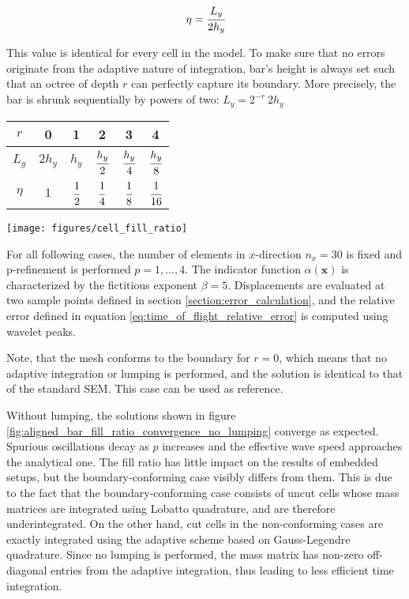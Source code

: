\begin{equation} \label{eq:fill_ratio}
	\eta = \cfrac{L_y}{2h_y}
\end{equation}

This value is identical for every cell in the model. To make sure that no errors originate from the adaptive nature of integration, bar's height is always set such that an octree of depth $r$ can perfectly capture its boundary. More precisely, the bar is shrunk sequentially by powers of two: $L_y = 2 ^{-r} \ 2h_y$

\begin{center}
\begin{minipage}[b]{0.45\textwidth}
	\centering
	\bgroup
		\def\arraystretch{2.5}
		\begin{tabular}{|c||c|c|c|c|c|}
			\hline
			$r$ & 0 & 1 & 2 & 3 & 4 \\
			\hline
			$L_y$ & $2h_y$ & $h_y$ & $\cfrac{h_y}{2}$ & $\cfrac{h_y}{4}$ & $\cfrac{h_y}{8}$ \\ 
			\hline
			$\eta$ & $1$ & $\cfrac{1}{2}$ & $\cfrac{1}{4}$ & $\cfrac{1}{8}$ & $\cfrac{1}{16}$ \\
			\hline
		\end{tabular}
	\egroup
\end{minipage}
\hfill
\begin{minipage}[b]{0.45\textwidth}
	\centering
	\texttt{[image: figures/cell\_fill\_ratio]}
\end{minipage}
\end{center}

For all following cases, the number of elements in $x$-direction $n_x=30$ is fixed and p-refinement is performed $p=1,...,4$. The indicator function $\alpha(\mathbf x)$ is characterized by the fictitious exponent $\beta = 5$. Displacements are evaluated at two sample points defined in section \ref{section:error_calculation}, and the relative error defined in equation \ref{eq:time_of_flight_relative_error} is computed using wavelet peaks.

Note, that the mesh conforms to the boundary for $r=0$, which means that no adaptive integration or lumping is performed, and the solution is identical to that of the standard SEM. This case can be used as reference.

Without lumping, the solutions shown in figure \ref{fig:aligned_bar_fill_ratio_convergence_no_lumping} converge as expected. Spurious oscillations decay as $p$ increases and the effective wave speed approaches the analytical one. The fill ratio has little impact on the results of embedded setups, but the boundary-conforming case visibly differs from them. This is due to the fact that the boundary-conforming case consists of uncut cells whose mass matrices are integrated using Lobatto quadrature, and are therefore underintegrated. On the other hand, cut cells in the non-conforming cases are exactly integrated using the adaptive scheme based on Gauss-Legendre quadrature.
Since no lumping is performed, the mass matrix has non-zero off-diagonal entries from the adaptive integration, thus leading to less efficient time integration.

